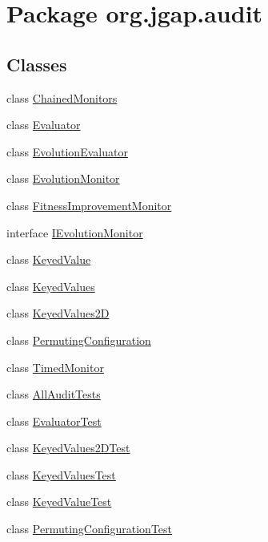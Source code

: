 \hypertarget{namespaceorg_1_1jgap_1_1audit}{\section{Package org.\-jgap.\-audit}
\label{namespaceorg_1_1jgap_1_1audit}
}
\subsection*{Classes}
\begin{DoxyCompactItemize}
\item 
class \hyperlink{classorg_1_1jgap_1_1audit_1_1_chained_monitors}{Chained\-Monitors}
\item 
class \hyperlink{classorg_1_1jgap_1_1audit_1_1_evaluator}{Evaluator}
\item 
class \hyperlink{classorg_1_1jgap_1_1audit_1_1_evolution_evaluator}{Evolution\-Evaluator}
\item 
class \hyperlink{classorg_1_1jgap_1_1audit_1_1_evolution_monitor}{Evolution\-Monitor}
\item 
class \hyperlink{classorg_1_1jgap_1_1audit_1_1_fitness_improvement_monitor}{Fitness\-Improvement\-Monitor}
\item 
interface \hyperlink{interfaceorg_1_1jgap_1_1audit_1_1_i_evolution_monitor}{I\-Evolution\-Monitor}
\item 
class \hyperlink{classorg_1_1jgap_1_1audit_1_1_keyed_value}{Keyed\-Value}
\item 
class \hyperlink{classorg_1_1jgap_1_1audit_1_1_keyed_values}{Keyed\-Values}
\item 
class \hyperlink{classorg_1_1jgap_1_1audit_1_1_keyed_values2_d}{Keyed\-Values2\-D}
\item 
class \hyperlink{classorg_1_1jgap_1_1audit_1_1_permuting_configuration}{Permuting\-Configuration}
\item 
class \hyperlink{classorg_1_1jgap_1_1audit_1_1_timed_monitor}{Timed\-Monitor}
\item 
class \hyperlink{classorg_1_1jgap_1_1audit_1_1_all_audit_tests}{All\-Audit\-Tests}
\item 
class \hyperlink{classorg_1_1jgap_1_1audit_1_1_evaluator_test}{Evaluator\-Test}
\item 
class \hyperlink{classorg_1_1jgap_1_1audit_1_1_keyed_values2_d_test}{Keyed\-Values2\-D\-Test}
\item 
class \hyperlink{classorg_1_1jgap_1_1audit_1_1_keyed_values_test}{Keyed\-Values\-Test}
\item 
class \hyperlink{classorg_1_1jgap_1_1audit_1_1_keyed_value_test}{Keyed\-Value\-Test}
\item 
class \hyperlink{classorg_1_1jgap_1_1audit_1_1_permuting_configuration_test}{Permuting\-Configuration\-Test}
\end{DoxyCompactItemize}
